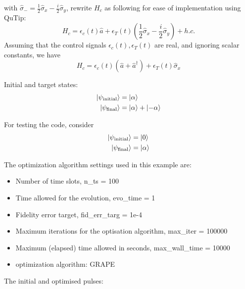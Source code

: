 \documentclass[12pt]{article}
\begin{document}
with $\hat{\sigma}_- = \frac{1}{2} \hat{\sigma}_x - \frac{i}{2}\hat{\sigma}_y$, 
rewrite $H_c$ as following for ease of implementation using QuTip:
\begin{equation}
    H_c = \epsilon_c(t) \hat{a} + \epsilon_T(t) (\frac{1}{2} \hat{\sigma}_x - \frac{i}{2}\hat{\sigma}_y) + h.c.
\end{equation}
Assuming that the control signals $\epsilon_c(t), \epsilon_T(t)$ are real, and ignoring scalar constants, we have 
$$
H_c = \epsilon_c(t) (\hat{a}+\hat{a}^{\dagger}) + \epsilon_T(t) \hat{\sigma}_x
$$

Initial and target states: 
$$
\begin{align*}
    \ket{\psi_{\text{initial}}} &= \ket{\alpha} \\
    \ket{\psi_{\text{final}}} &= \ket{\alpha} + \ket{-\alpha}
\end{align*}
$$

For testing the code, consider
$$
\begin{align*}
    \ket{\psi_{\text{initial}}} &= \ket{0} \\
    \ket{\psi_{\text{final}}} &= \ket{\alpha}
\end{align*}
$$

The optimization algorithm settings used in this example are: 
\begin{itemize}
    \item Number of time slots, n\_ts = 100
    \item Time allowed for the evolution, evo\_time = 1
    \item Fidelity error target, fid\_err\_targ = 1e-4
    \item Maximum iterations for the optisation algorithm, max\_iter = 100000
    \item Maximum (elapsed) time allowed in seconds, max\_wall\_time = 10000
    \item optimization algorithm: GRAPE
\end{itemize}

The initial and optimised pulses:
\end{document}
